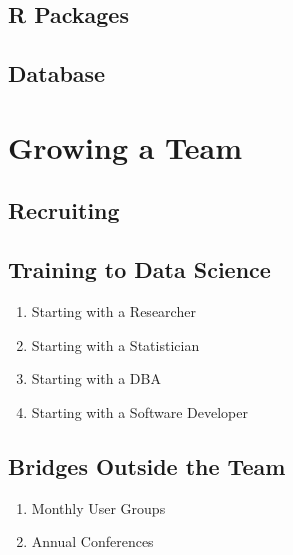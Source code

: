 \documentclass[]{book}
\providecommand{\tightlist}{%
  \setlength{\itemsep}{0pt}\setlength{\parskip}{0pt}}
\begin{document}
\hypertarget{r-packages}{%
\section{R Packages}\label{r-packages}}

\hypertarget{database}{%
\section{Database}\label{database}}

\hypertarget{team}{%
\chapter{Growing a Team}\label{team}}

\hypertarget{recruiting}{%
\section{Recruiting}\label{recruiting}}

\hypertarget{training-to-data-science}{%
\section{Training to Data Science}\label{training-to-data-science}}

\begin{enumerate}
\def\labelenumi{\arabic{enumi}.}
\tightlist
\item
  Starting with a Researcher
\item
  Starting with a Statistician
\item
  Starting with a DBA
\item
  Starting with a Software Developer
\end{enumerate}

\hypertarget{bridges-outside-the-team}{%
\section{Bridges Outside the Team}\label{bridges-outside-the-team}}

\begin{enumerate}
\def\labelenumi{\arabic{enumi}.}
\tightlist
\item
  Monthly User Groups
\item
  Annual Conferences
\end{enumerate}

\cleardoublepage

\hypertarget{appendix-appendix}{%
\appendix}
\end{document}
